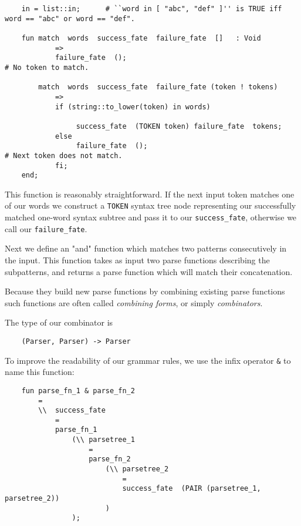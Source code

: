 \begin{verbatim}
    in = list::in;      # ``word in [ "abc", "def" ]'' is TRUE iff word == "abc" or word == "def".

    fun match  words  success_fate  failure_fate  []   : Void
            =>
            failure_fate  ();                                               # No token to match.

        match  words  success_fate  failure_fate (token ! tokens)
            =>
            if (string::to_lower(token) in words)

                 success_fate  (TOKEN token) failure_fate  tokens;
            else
                 failure_fate  ();                                          # Next token does not match.
            fi;     
    end;
\end{verbatim}

This function is reasonably straightforward.  If the next input token 
matches one of our words we construct a {\tt TOKEN} syntax tree 
node representing our successfully matched one-word syntax subtree 
and pass it to our {\tt success\_fate}, otherwise we call our 
{\tt failure\_fate}.

Next we define an "and" function which matches two patterns consecutively 
in the input.  This function takes as input two parse functions describing 
the subpatterns, and returns a parse function which will match their 
concatenation.

Because they build new parse functions by combining existing 
parse functions such 
functions are often called {\it combining forms}, or simply {\it 
combinators}.

The type of our combinator is

\begin{verbatim}
    (Parser, Parser) -> Parser 
\end{verbatim}

To improve the readability of our grammar rules, we 
use the infix operator {\tt \&} to name this function:

\begin{verbatim}
    fun parse_fn_1 & parse_fn_2
        =
        \\  success_fate
            =
            parse_fn_1
                (\\ parsetree_1
                    =
                    parse_fn_2
                        (\\ parsetree_2
                            =
                            success_fate  (PAIR (parsetree_1, parsetree_2))
                        )
                );
\end{verbatim}

